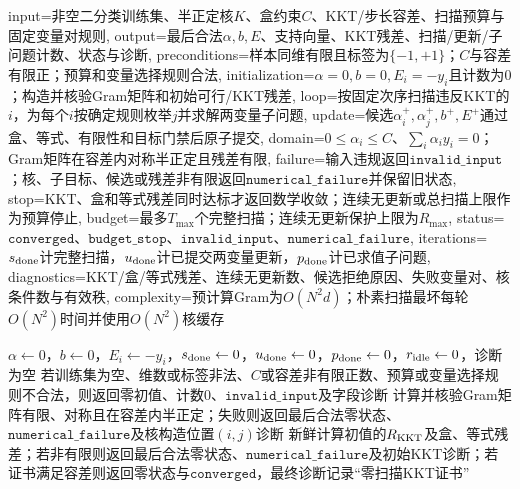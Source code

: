 \begin{AlgorithmContract}{
  input={非空二分类训练集、半正定核$K$、盒约束$C$、KKT/步长容差、扫描预算与固定变量对规则},
  output={最后合法$\alpha,b,E$、支持向量、KKT残差、扫描/更新/子问题计数、状态与诊断},
  preconditions={样本同维有限且标签为$\{-1,+1\}$；$C$与容差有限正；预算和变量选择规则合法},
  initialization={$\alpha=0,b=0,E_i=-y_i$且计数为$0$；构造并核验Gram矩阵和初始可行/KKT残差},
  loop={按固定次序扫描违反KKT的$i$，为每个$i$按确定规则枚举$j$并求解两变量子问题},
  update={候选$\alpha_i^+,\alpha_j^+,b^+,E^+$通过盒、等式、有限性和目标门禁后原子提交},
  domain={$0\le\alpha_i\le C$、$\sum_i\alpha_i y_i=0$；Gram矩阵在容差内对称半正定且残差有限},
  failure={输入违规返回$\mathtt{invalid\_input}$；核、子目标、候选或残差非有限返回$\mathtt{numerical\_failure}$并保留旧状态},
  stop={KKT、盒和等式残差同时达标才返回数学收敛；连续无更新或总扫描上限作为预算停止},
  budget={最多$T_{\max}$个完整扫描；连续无更新保护上限为$R_{\max}$},
  status={$\mathtt{converged}$、$\mathtt{budget\_stop}$、$\mathtt{invalid\_input}$、$\mathtt{numerical\_failure}$},
  iterations={$s_{\rm done}$计完整扫描，$u_{\rm done}$计已提交两变量更新，$p_{\rm done}$计已求值子问题},
  diagnostics={KKT/盒/等式残差、连续无更新数、候选拒绝原因、失败变量对、核条件数与有效秩},
  complexity={预计算Gram为$O(N^2d)$；朴素扫描最坏每轮$O(N^2)$时间并使用$O(N^2)$核缓存}
}
\begin{algorithm}[H]
\caption{序列最小最优化（SMO）}\label{alg:V3-C02-smo}
$\alpha\leftarrow0$，$b\leftarrow0$，$E_i\leftarrow-y_i$，$s_{\rm done}\leftarrow0$，$u_{\rm done}\leftarrow0$，$p_{\rm done}\leftarrow0$，$r_{\rm idle}\leftarrow0$，诊断为空\;
若训练集为空、维数或标签非法、$C$或容差非有限正数、预算或变量选择规则不合法，则返回零初值、计数$0$、$\mathtt{invalid\_input}$及字段诊断\;
计算并核验Gram矩阵有限、对称且在容差内半正定；失败则返回最后合法零状态、$\mathtt{numerical\_failure}$及核构造位置$(i,j)$诊断\;
新鲜计算初值的$R_{\rm KKT}$及盒、等式残差；若非有限则返回最后合法零状态、$\mathtt{numerical\_failure}$及初始KKT诊断；若证书满足容差则返回零状态与$\mathtt{converged}$，最终诊断记录“零扫描KKT证书”\;
\end{algorithm}
\end{AlgorithmContract}

